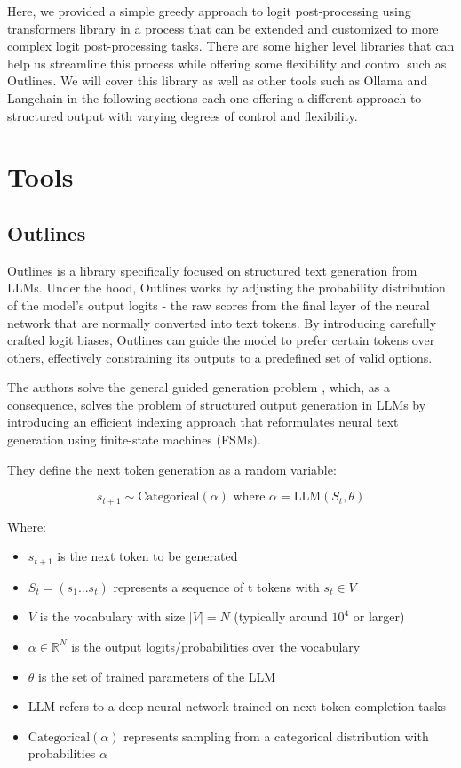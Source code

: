 Here, we provided a simple greedy approach to logit post-processing using transformers library in a process that can be extended and customized to more complex logit post-processing tasks. There are some higher level libraries that can help us streamline this process while offering some flexibility and control such as Outlines. We will cover this library as well as other tools such as Ollama and Langchain in the following sections each one offering a different approach to structured output with varying degrees of control and flexibility.

\section{Tools}

\subsection{Outlines}

Outlines \cite{outlines2024} is a library specifically focused on structured text generation from LLMs. Under the hood, Outlines works by adjusting the probability distribution of the model's output logits - the raw scores from the final layer of the neural network that are normally converted into text tokens. By introducing carefully crafted logit biases, Outlines can guide the model to prefer certain tokens over others, effectively constraining its outputs to a predefined set of valid options.

The authors solve the general guided generation problem \cite{willard2023efficientguidedgenerationlarge}, which, as a consequence, solves the problem of structured output generation in LLMs by introducing an efficient indexing approach that reformulates neural text generation using finite-state machines (FSMs).

They define the next token generation as a random variable:

\[s_{t+1} \sim \text{Categorical}(\alpha) \text{ where } \alpha = \text{LLM}(S_t, \theta)\]

Where:

\begin{itemize}
    \item $s_{t+1}$ is the next token to be generated
    \item $S_t = (s_1...s_t)$ represents a sequence of t tokens with $s_t \in V$
    \item $V$ is the vocabulary with size $|V| = N$ (typically around $10^4$ or larger)
    \item $\alpha \in \mathbb{R}^N$ is the output logits/probabilities over the vocabulary
    \item $\theta$ is the set of trained parameters of the LLM
    \item $\text{LLM}$ refers to a deep neural network trained on next-token-completion tasks
    \item $\text{Categorical}(\alpha)$ represents sampling from a categorical distribution with probabilities $\alpha$
\end{itemize}


